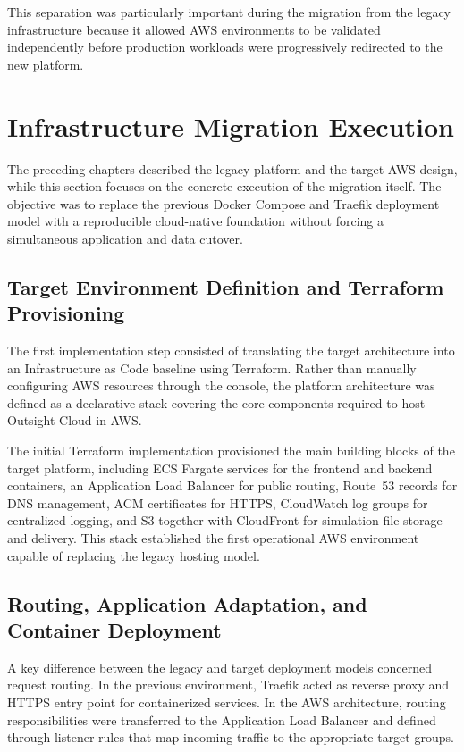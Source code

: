 This separation was particularly important during the migration from the legacy infrastructure because it allowed AWS environments to be validated independently before production workloads were progressively redirected to the new platform.

\section{Infrastructure Migration Execution}
\label{sec:infra-migration-exec}
The preceding chapters described the legacy platform and the target AWS design, while this section focuses on the concrete execution of the migration itself. The objective was to replace the previous Docker Compose and Traefik deployment model with a reproducible cloud-native foundation without forcing a simultaneous application and data cutover.

\subsection{Target Environment Definition and Terraform Provisioning}
The first implementation step consisted of translating the target architecture into an Infrastructure as Code baseline using Terraform. Rather than manually configuring AWS resources through the console, the platform architecture was defined as a declarative stack covering the core components required to host Outsight Cloud in AWS.

The initial Terraform implementation provisioned the main building blocks of the target platform, including ECS Fargate services for the frontend and backend containers, an Application Load Balancer for public routing, Route~53 records for DNS management, ACM certificates for HTTPS, CloudWatch log groups for centralized logging, and S3 together with CloudFront for simulation file storage and delivery. This stack established the first operational AWS environment capable of replacing the legacy hosting model.

\subsection{Routing, Application Adaptation, and Container Deployment}
A key difference between the legacy and target deployment models concerned request routing. In the previous environment, Traefik acted as reverse proxy and HTTPS entry point for containerized services. In the AWS architecture, routing responsibilities were transferred to the Application Load Balancer and defined through listener rules that map incoming traffic to the appropriate target groups.

